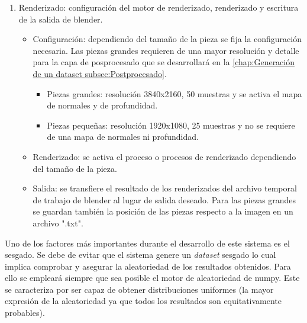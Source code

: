 \begin{enumerate}
\item Renderizado: configuración del motor de renderizado, renderizado y escritura de la salida de blender.
\begin{itemize}
\item Configuración: dependiendo del tamaño de la pieza se fija la configuración necesaria. Las piezas grandes requieren de una mayor resolución y detalle para la capa de posprocesado que se desarrollará en la \autoref{chap:Generación de un dataset subsec:Postprocesado}.
\begin{itemize}
\item Piezas grandes: resolución 3840x2160, 50 muestras y se activa el mapa de normales y de profundidad.
\item Piezas pequeñas: resolución 1920x1080, 25 muestras y no se requiere de una mapa de normales ni profundidad.
\end{itemize}
\item Renderizado: se activa el proceso o procesos de renderizado dependiendo del tamaño de la pieza.
\item Salida: se transfiere el resultado de los renderizados del archivo temporal de trabajo de blender al lugar de salida deseado. Para las piezas grandes se guardan también la posición de las piezas respecto a la imagen en un archivo ".txt".
\end{itemize}
\end{enumerate}

Uno de los factores más importantes durante el desarrollo de este sistema es el sesgado. Se debe de evitar que el sistema genere un \textit{dataset} sesgado lo cual implica comprobar y asegurar la aleatoriedad de los resultados obtenidos. Para ello se empleará siempre que sea posible el motor de aleatoriedad de numpy. Este se caracteriza por ser capaz de obtener distribuciones uniformes (la mayor expresión de la aleatoriedad ya que todos los resultados son equitativamente probables).

